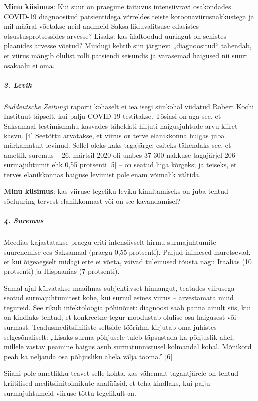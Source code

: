 \textbf{Minu küsimus}: Kui suur on praegune täituvus intensiivravi
osakondades COVID-19 diagnoositud patsientidega võrreldes teiste
koroonaviirusnakkustega ja mil määral võetakse neid andmeid Saksa
liiduvalitsuse edasistes otsustusprotsessides arvesse? Lisaks: kas
ülaltoodud uuringut on senistes plaanides arvesse võetud? Muidugi kehtib
siin järgnev: „diagnoositud`` tähendab, et viirus mängib olulist rolli
patsiendi seisundis ja varasemad haigused nii suurt osakaalu ei oma.

\hypertarget{3-levik}{%
\subparagraph{\texorpdfstring{\textbf{3.
Levik}}{3. Levik}}\label{3-levik}}

\emph{Süddeutsche Zeitung}i raporti kohaselt ei tea isegi siinkohal
viidatud Robert Kochi Instituut täpselt, kui palju COVID-19 testitakse.
Tõsiasi on aga see, et Saksamaal testimismahu kasvades täheldati hiljuti
haigusjuhtude arvu kiiret kasvu. {[}4{]} Seetõttu arvatakse, et viirus
on terve elanikkonna hulgas juba märkamatult levinud. Sellel oleks kaks
tagajärge: esiteks tähendaks see, et ametlik suremus -- 26. märtsil 2020
oli umbes 37 300 nakkuse tagajärjel 206 surmajuhtumit ehk 0,55 protsenti
{[}5{]} -- on seatud liiga kõrgeks; ja teiseks, et terves elanikkonnas
haiguse levimist pole enam võimalik vältida.

\textbf{Minu küsimus}: kas viiruse tegeliku leviku kinnitamiseks on juba
tehtud sõeluuring tervest elanikkonnast või on see kavandamisel?

\hypertarget{4-suremus}{%
\subparagraph{\texorpdfstring{\textbf{4.
Suremus}}{4. Suremus}}\label{4-suremus}}

Meedias kajastatakse praegu eriti intensiivselt hirmu surmajuhtumite
suurenemise ees Saksamaal (praegu 0,55 protsenti). Paljud inimesed
muretsevad, et kui õigeaegselt midagi ette ei võeta, võivad tulemused
tõusta nagu Itaalias (10 protsenti) ja Hispaanias (7 protsenti).

Samal ajal külvatakse maailmas subjektiivset hinnangut, teatades
viirusega seotud surmajuhtumitest kohe, kui surnul esines viirus --
arvestamata muid tegureid. See rikub infektoloogia põhinõuet: diagnoosi
saab panna ainult siis, kui on kindlaks tehtud, et konkreetne tegur
moodustab olulise osa haigusest või surmast. Teadusmeditsiiniliste
seltside töörühm kirjutab oma juhistes selgesõnaliselt: „Lisaks surma
põhjusele tuleb täpsustada ka põhjuslik ahel, millele vastav peamine
haigus asub surmatunnistusel kolmandal kohal. Mõnikord peab ka neljanda
osa põhjusliku ahela välja tooma.'' {[}6{]}

Siiani pole ametlikku teavet selle kohta, kas vähemalt tagantjärele on
tehtud kriitilised meditsiinitoimikute analüüsid, et teha kindlaks, kui
palju surmajuhtumeid viiruse tõttu tegelikult on.

